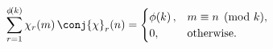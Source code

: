 \[\sum_{r=1}^{\mathop{\phi\/}\nolimits\!\left(k\right)}\mathop{\chi_{r}\/}%
\nolimits\!\left(m\right)\conj{\mathop{\chi\/}\nolimits}_{r}(n)=\begin{cases}%
\mathop{\phi\/}\nolimits\!\left(k\right),&m\equiv n\pmod{k},\\
0,&\mbox{otherwise}.\end{cases}\]